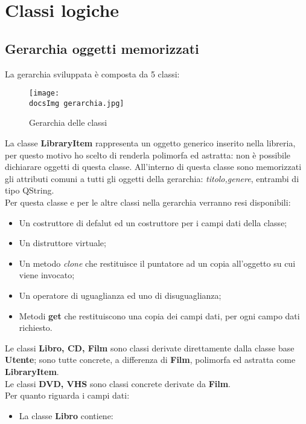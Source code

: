 \section{Classi logiche}{
	\subsection{Gerarchia oggetti memorizzati}{
		La gerarchia sviluppata è composta da 5 classi: 
		
		\begin{figure}[h]
			\center
			\texttt{[image: \\docsImg gerarchia.jpg]}
			\caption{Gerarchia delle classi}
		\end{figure} 
		
		La classe \textbf{LibraryItem} rappresenta un oggetto generico inserito nella libreria, per questo motivo ho scelto di renderla polimorfa ed astratta: non è possibile dichiarare oggetti di questa classe. All'interno di questa classe sono memorizzati gli attributi comuni a tutti gli oggetti della gerarchia: \textit{titolo,genere}, entrambi di tipo QString. \\
		Per questa classe e per le altre classi nella gerarchia verranno resi disponibili:
		\begin{itemize}\itemsep=0.5pt
			\item Un costruttore di defalut ed un costruttore per i campi dati della classe;
			\item Un distruttore virtuale;
			\item Un metodo \textit{clone} che restituisce il puntatore ad un copia all'oggetto su cui viene invocato;
			\item Un operatore di uguaglianza ed uno di disuguaglianza;
			\item Metodi \textbf{get} che restituiscono una copia dei campi dati, per ogni campo dati richiesto.
		\end{itemize}
			Le classi  \textbf{Libro, CD, Film} sono classi derivate direttamente dalla classe base \textbf{Utente}; sono tutte concrete, a differenza di \textbf{Film},  polimorfa ed astratta come \textbf{LibraryItem}. \\
			Le classi \textbf{DVD, VHS} sono classi concrete derivate da \textbf{Film}. \\
			Per quanto riguarda i campi dati:
			\begin{itemize}\itemsep=0.5pt
				\item La classe \textbf{Libro} contiene:
				\begin{itemize}\itemsep=0.5pt

\end{itemize}
\end{itemize}}}

